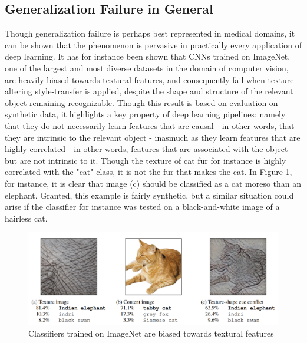 	\subsection{Generalization Failure in General}
	Though generalization failure is perhaps best represented in medical domains, it can be shown that the phenomenon is pervasive in practically every application of deep learning. It has for instance been shown that CNNs trained on ImageNet, one of the largest and most diverse datasets in the domain of computer vision, are heavily biased towards textural features, and consequently fail when texture-altering style-transfer is applied, despite the shape and structure of the relevant object remaining recognizable\cite{texturebias}. Though this result is based on evaluation on synthetic data, it highlights a key property of deep learning pipelines: namely that they do not necessarily learn features that are causal - in other words, that they are intrinsic to the relevant object - inasmuch as they learn features that are highly correlated - in other words, features that are associated with the object but are not intrinsic to it. Though the texture of cat fur for instance is highly correlated with the "cat" class, it is not the fur that makes the cat. In Figure \ref{cat_elephant}, for instance, it is clear that image (c) should be classified as a cat moreso than an elephant. Granted, this example is fairly synthetic, but a similar situation could arise if the classifier for instance was tested on a black-and-white image of a hairless cat. 
	\begin{figure}[h]
		\includegraphics[width=\linewidth]{illustrations/cat_elephant.png}
		\caption{Classifiers trained on ImageNet are biased towards textural features}
		\label{cat_elephant}
	\end{figure}
	

